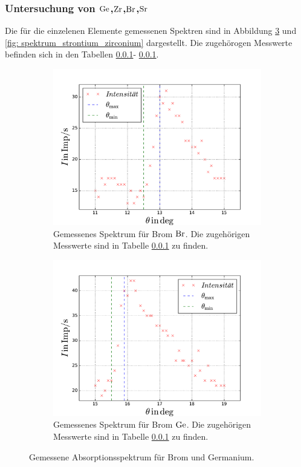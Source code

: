 \subsubsection{Untersuchung von $\ce{Ge}$,$\ce{Zr}$,$\ce{Br}$,$\ce{Sr}$}
Die für die einzelenen Elemente gemessenen Spektren sind in Abbildung \ref{fig: spektrum_brom_germanium} und
\ref{fig: spektrum_strontium_zirconium} dargestellt. Die zugehörogen Messwerte befinden sich in den Tabellen \ref{}- \ref{}.
\begin{figure}
  \centering
  \begin{subfigure}{0.48\textwidth}
    \centering
    \includegraphics[width=1 \textwidth]{../Messdaten/brom.pdf}
    \caption{Gemessenes Spektrum für Brom $\ce{Br}$. Die zugehörigen Messwerte sind in Tabelle \ref{} zu finden.} %
    \label{fig: brom_spektrum}
  \end{subfigure}
  \begin{subfigure}{0.48\textwidth}
    \centering
    \includegraphics[width=1 \textwidth]{../Messdaten/germanium.pdf}
    \caption{Gemessenes Spektrum für Brom $\ce{Ge}$. Die zugehörigen Messwerte sind in Tabelle \ref{} zu finden.} %
    \label{fig: germaium_spektrum}
  \end{subfigure}
  \caption{Gemessene Absorptionsspektrum für Brom und Germanium.}
  \label{fig: spektrum_brom_germanium}
\end{figure}
